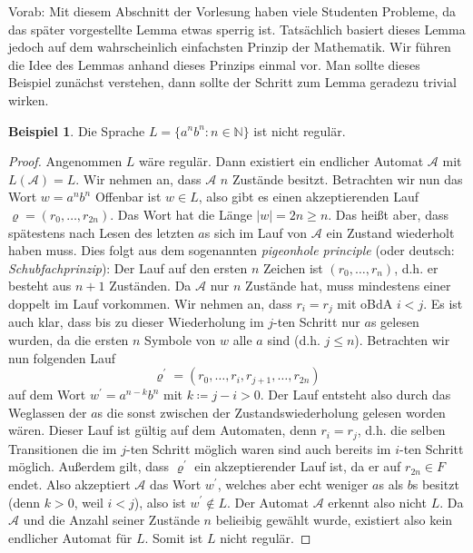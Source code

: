 \documentclass[11pt, a4paper]{article}
\theoremstyle{definition}
\newtheorem{example}[definition]{Beispiel}
\theoremstyle{plain}
\numberwithin{equation}{section}
\begin{document}
Vorab: Mit diesem Abschnitt der Vorlesung haben viele Studenten Probleme, da das später vorgestellte Lemma etwas sperrig ist. Tatsächlich basiert dieses Lemma jedoch auf dem wahrscheinlich einfachsten Prinzip der Mathematik. Wir führen die Idee des Lemmas anhand dieses Prinzips einmal vor. Man sollte dieses Beispiel zunächst verstehen, dann sollte der Schritt zum Lemma geradezu trivial wirken.
\begin{example}\label{exp:pumping1}
	Die Sprache $L = \{a^n b^n : n \in \mathbb{N} \}$ ist nicht regulär.
	\begin{proof}
		Angenommen $L$ wäre regulär. Dann existiert ein endlicher Automat $\mathcal{A}$ mit $L(\mathcal{A}) = L$. Wir nehmen an, dass $\mathcal{A}$ $n$ Zustände besitzt. Betrachten wir nun das Wort $w = a^n b^n$ Offenbar ist $w \in L$, also gibt es einen akzeptierenden Lauf $\varrho = (r_0, \ldots, r_{2n})$. Das Wort hat die Länge $|w| = 2n \geq n$. Das heißt aber, dass spätestens nach Lesen des letzten $a$s sich im Lauf von $\mathcal{A}$ ein Zustand wiederholt haben muss. Dies folgt aus dem sogenannten \textit{pigeonhole principle} (oder deutsch: \textit{Schubfachprinzip}): Der Lauf auf den ersten $n$ Zeichen ist $(r_0, \ldots, r_n)$, d.h. er besteht aus $n+1$ Zuständen. Da $\mathcal{A}$ nur $n$ Zustände hat, muss mindestens einer doppelt im Lauf vorkommen. Wir nehmen an, dass $r_i = r_j$ mit oBdA $i < j$. Es ist auch klar, dass bis zu dieser Wiederholung im $j$-ten Schritt nur $a$s gelesen wurden, da die ersten $n$ Symbole von $w$ alle $a$ sind (d.h. $j \leq n$). Betrachten wir nun folgenden Lauf
		$$
			\varrho^\prime = (r_0, \ldots, r_i, r_{j+1}, \ldots, r_{2n})
		$$
		auf dem Wort $w^\prime = a^{n-k}b^n$ mit $k \coloneqq j-i > 0$. Der Lauf entsteht also durch das Weglassen der $a$s die sonst zwischen der Zustandswiederholung gelesen worden wären. Dieser Lauf ist gültig auf dem Automaten, denn $r_i = r_j$, d.h. die selben Transitionen die im $j$-ten Schritt möglich waren sind auch bereits im $i$-ten Schritt möglich. Außerdem gilt, dass $\varrho^\prime$ ein akzeptierender Lauf ist, da er auf $r_{2n} \in F$ endet. Also akzeptiert $\mathcal{A}$ das Wort $w^\prime$, welches aber echt weniger $a$s als $b$s besitzt (denn $k > 0$, weil $i < j$), also ist $w^\prime \notin L$. Der Automat $\mathcal{A}$ erkennt also nicht $L$. Da $\mathcal{A}$ und die Anzahl seiner Zustände $n$ belieibig gewählt wurde, existiert also kein endlicher Automat für $L$. Somit ist $L$ nicht regulär.
	\end{proof}
\end{example}
\end{document}
